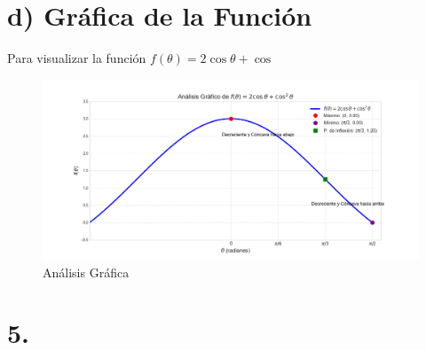 \documentclass[12pt, letterpaper]{article}
\begin{document}
\section*{d) Gráfica de la Función}
Para visualizar la función $f(\theta) = 2\cos\theta + \cos$

\begin{figure}[h!]
    \centering
    \includegraphics[width=1\textwidth]{Figure_4.png}
    \caption{Análisis Gráfica}
    \label{fig:Figure_2}
\end{figure}
\section*{5.}
\end{document}
